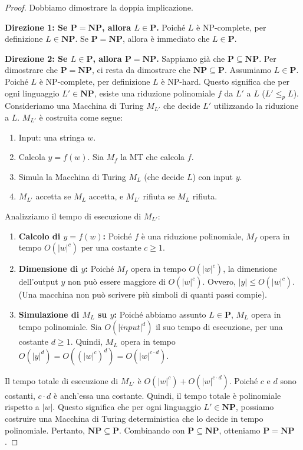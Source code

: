 \documentclass[a4paper]{article}
\begin{document}
\begin{proof}
Dobbiamo dimostrare la doppia implicazione.

\textbf{Direzione 1: Se $\mathbf{P} = \mathbf{NP}$, allora $L \in \mathbf{P}$.}
Poiché $L$ è NP-complete, per definizione $L \in \mathbf{NP}$. Se $\mathbf{P} = \mathbf{NP}$, allora è immediato che $L \in \mathbf{P}$.

\textbf{Direzione 2: Se $L \in \mathbf{P}$, allora $\mathbf{P} = \mathbf{NP}$.}
Sappiamo già che $\mathbf{P} \subseteq \mathbf{NP}$. Per dimostrare che $\mathbf{P} = \mathbf{NP}$, ci resta da dimostrare che $\mathbf{NP} \subseteq \mathbf{P}$.
Assumiamo $L \in \mathbf{P}$.
Poiché $L$ è NP-complete, per definizione $L$ è NP-hard.
Questo significa che per ogni linguaggio $L' \in \mathbf{NP}$, esiste una riduzione polinomiale $f$ da $L'$ a $L$ ($L' \le_p L$).
Consideriamo una Macchina di Turing $M_{L'}$ che decide $L'$ utilizzando la riduzione a $L$. $M_{L'}$ è costruita come segue:
\begin{enumerate}
    \item Input: una stringa $w$.
    \item Calcola $y = f(w)$. Sia $M_f$ la MT che calcola $f$.
    \item Simula la Macchina di Turing $M_L$ (che decide $L$) con input $y$.
    \item $M_{L'}$ accetta se $M_L$ accetta, e $M_{L'}$ rifiuta se $M_L$ rifiuta.
\end{enumerate}

Analizziamo il tempo di esecuzione di $M_{L'}$:
\begin{enumerate}
    \item \textbf{Calcolo di $y = f(w)$:} Poiché $f$ è una riduzione polinomiale, $M_f$ opera in tempo $O(|w|^c)$ per una costante $c \ge 1$.
    \item \textbf{Dimensione di $y$:} Poiché $M_f$ opera in tempo $O(|w|^c)$, la dimensione dell'output $y$ non può essere maggiore di $O(|w|^c)$. Ovvero, $|y| \le O(|w|^c)$. (Una macchina non può scrivere più simboli di quanti passi compie).
    \item \textbf{Simulazione di $M_L$ su $y$:} Poiché abbiamo assunto $L \in \mathbf{P}$, $M_L$ opera in tempo polinomiale. Sia $O(|input|^d)$ il suo tempo di esecuzione, per una costante $d \ge 1$.
    Quindi, $M_L$ opera in tempo $O(|y|^d) = O((|w|^c)^d) = O(|w|^{c \cdot d})$.
\end{enumerate}
Il tempo totale di esecuzione di $M_{L'}$ è $O(|w|^c) + O(|w|^{c \cdot d})$. Poiché $c$ e $d$ sono costanti, $c \cdot d$ è anch'essa una costante. Quindi, il tempo totale è polinomiale rispetto a $|w|$.
Questo significa che per ogni linguaggio $L' \in \mathbf{NP}$, possiamo costruire una Macchina di Turing deterministica che lo decide in tempo polinomiale.
Pertanto, $\mathbf{NP} \subseteq \mathbf{P}$.
Combinando con $\mathbf{P} \subseteq \mathbf{NP}$, otteniamo $\mathbf{P} = \mathbf{NP}$.
\end{proof}
\end{document}
